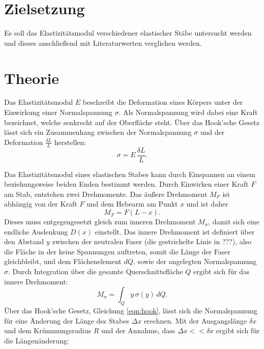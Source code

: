\section{Zielsetzung}
    Es soll das Elastizitätsmodul verschiedener elastischer Stäbe untersucht werden und dieses anschließend 
    mit Literaturwerten verglichen werden.
\section{Theorie}
\label{sec:theorie}
    Das Elastizitätsmodul $E$ beschreibt die Deformation eines Körpers unter der Einwirkung einer Normalspannung $\sigma$. Als Normalspannung wird dabei eine Kraft
    bezeichnet, welche senkrecht auf der Oberfläche steht. Über das Hook'sche Gesetz lässt sich ein Zusammenhang zwischen der Normalspannung $\sigma$ und
    der Deformation $\frac{\delta L}{L}$ herstellen:
    \begin{equation}
    \label{eqn:hook}
        \sigma = E \, \frac{\delta L}{L}.
    \end{equation}

    Das Elastizitätsmodul eines elastischen Stabes kann durch Einspannen an einem beziehungsweise beiden Enden bestimmt werden.
    Durch Einwirken einer Kraft $F$ am Stab, entstehen zwei Drehmomente. Das äußere Drehmoment $M_F$ ist abhängig von der Kraft $F$ und dem Hebearm am Punkt $x$ und 
    ist daher 
    \begin{equation}
    \label{eqn:drehmomentA}
    M_F = F (L-x).
    \end{equation}
    Dieses muss entgegengesetzt gleich zum inneren Drehmoment $M_\sigma$, damit sich eine endliche Auslenkung $D(x)$ einstellt.
    Das innere Drehmoment ist definiert über den Abstand $y$ zwischen der neutralen Faser (die gestrichelte Linie in ???), also die Fläche in der keine Spannungen
    auftreten, somit die Länge der Faser gleichbleibt, und dem Flächenelement $dQ$, sowie der angelegten Normalspannung $\sigma$. Durch Integration über die gesamte
    Querschnittsfläche $Q$ ergibt sich für das innere Drehmoment:
    \begin{equation}
    \label{eqn:drehmomentI} 
    M_\sigma = \int_Q y \, \sigma (y) \, dQ.
    \end{equation}
    Über das Hook'sche Gesetz, Gleichung \eqref{eqn:hook}, lässt sich die Normalspannung für eine Änderung der Länge des Stabes $\Delta x$ erechnen.
    Mit der Ausgangslänge $\delta x$ und dem Krümmungsradius $R$ und der Annahme, dass $\Delta x << \delta x$ ergibt sich für die Längenänderung:
     